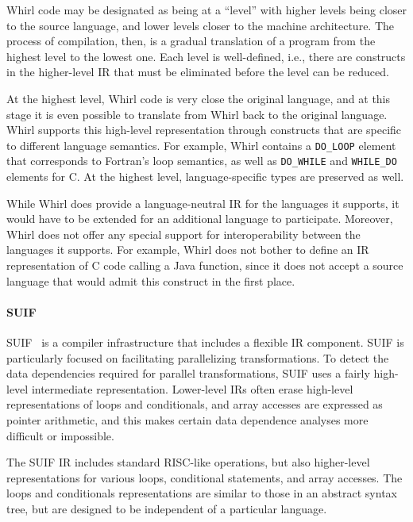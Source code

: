 Whirl code may be designated as being at a ``level'' with higher levels being closer to the source language, and lower levels closer to the machine architecture. The process of compilation, then, is a gradual translation of a program from the highest level to the lowest one. Each level is well-defined, i.e., there are constructs in the higher-level IR that must be eliminated before the level can be reduced.

At the highest level, Whirl code is very close the original language, and at this stage it is even possible to translate from Whirl back to the original language. Whirl supports this high-level representation through constructs that are specific to different language semantics. For example, Whirl contains a \texttt{DO\_LOOP} element that corresponds to Fortran's loop semantics, as well as \texttt{DO\_WHILE} and \texttt{WHILE\_DO} elements for C. At the highest level, language-specific types are preserved as well.

While Whirl does provide a language-neutral IR for the languages it supports, it would have to be extended for an additional language to participate. Moreover, Whirl does not offer any special support for interoperability between the languages it supports. For example, Whirl does not bother to define an IR representation of C code calling a Java function, since it does not accept a source language that would admit this construct in the first place.


\paragraph{SUIF}

SUIF~\cite{wilson94suif} is a compiler infrastructure that includes a flexible IR component. SUIF is particularly focused on facilitating parallelizing transformations. To detect the data dependencies required for parallel transformations, SUIF uses a fairly high-level intermediate representation. Lower-level IRs often erase high-level representations of loops and conditionals, and array accesses are expressed as pointer arithmetic, and this makes certain data dependence analyses more difficult or impossible.

The SUIF IR includes standard RISC-like operations, but also higher-level representations for various loops, conditional statements, and array accesses. The loops and conditionals representations are similar to those in an abstract syntax tree, but are designed to be independent of a particular language.

